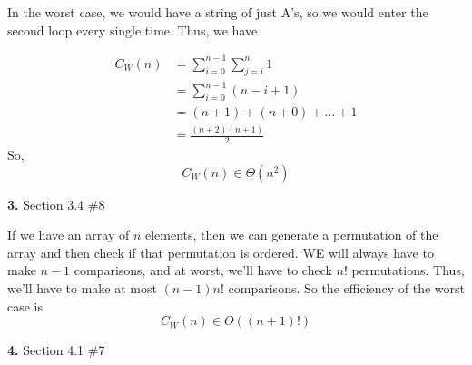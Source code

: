 \documentclass[letterpaper, 11pt]{article}
\newcommand{\hwnumbersec}[3]{\medskip \noindent\textbf{#1.} Section #2 \##3 \smallskip}
\begin{document}
In the worst case, we would have a string of just A's, so we would enter the
second loop every single time. Thus, we have

\begin{align*}
  C_W(n) &= \sum_{i=0}^{n-1} \sum_{j=i}^{n} 1 \\
         &= \sum_{i=0}^{n-1} (n - i + 1) \\
         &= (n + 1) + (n + 0) + \dots + 1 \\
         &= \frac{(n+2)(n+1)}{2}
\end{align*}
So,
\[C_W(n) \in \Theta(n^2)\]

\hwnumbersec{3}{3.4}{8}

If we have an array of \(n\) elements, then we can generate a permutation of the
array and then check if that permutation is ordered. WE will always have to
make \(n -1\) comparisons, and at worst, we'll have to check \(n!\)
permutations. Thus, we'll have to make at most \((n-1)n!\) comparisons. So the
efficiency of the worst case is 
\[C_W(n) \in O((n + 1)!)\]

\hwnumbersec{4}{4.1}{7}
\end{document}
